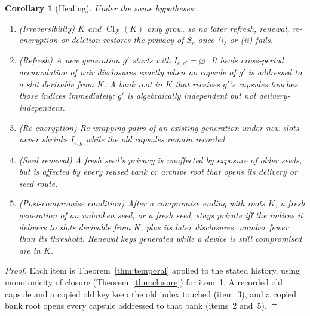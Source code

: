 \documentclass[pdflatex,sn-mathphys-num]{sn-jnl}
\theoremstyle{plain}
\newtheorem{corollary}[theorem]{Corollary}
\theoremstyle{definition}
\newcommand{\Cl}{\operatorname{Cl}}
\begin{document}
\begin{corollary}[Healing]\label{cor:healing}
Under the same hypotheses:
\begin{enumerate}
\item (Irreversibility) $K$ and $\Cl_{\mathcal R}(K)$ only grow, so no later refresh, renewal, re-encryption or deletion restores the privacy of $S_e$ once (i) or (ii) fails.
\item (Refresh) A new generation $g'$ starts with $I_{e,g'}=\varnothing$. It heals cross-period accumulation of pair disclosures exactly when no capsule of $g'$ is addressed to a slot derivable from $K$. A bank root in $K$ that receives $g'$'s capsules touches those indices immediately: $g'$ is algebraically independent but not delivery-independent.
\item (Re-encryption) Re-wrapping pairs of an existing generation under new slots never shrinks $I_{e,g}$ while the old capsules remain recorded.
\item (Seed renewal) A fresh seed's privacy is unaffected by exposure of older seeds, but is affected by every reused bank or archive root that opens its delivery or seed route.
\item (Post-compromise condition) After a compromise ending with roots $K$, a fresh generation of an unbroken seed, or a fresh seed, stays private iff the indices it delivers to slots derivable from $K$, plus its later disclosures, number fewer than its threshold. Renewal keys generated while a device is still compromised are in $K$.
\end{enumerate}
\end{corollary}
\begin{proof}
Each item is Theorem~\ref{thm:temporal} applied to the stated history, using monotonicity of closure (Theorem~\ref{thm:closure}) for item~1. A recorded old capsule and a copied old key keep the old index touched (item~3), and a copied bank root opens every capsule addressed to that bank (items~2 and~5).
\end{proof}
\end{document}
